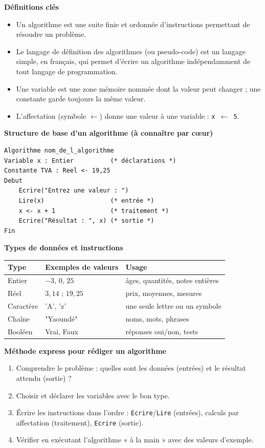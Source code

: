 \documentclass[11pt]{article}
\newcommand{\cle}[1]{{\popxbold\color{popdark}#1}}
\begin{document}
\begin{bilan}
\textbf{Définitions clés}
\begin{itemize}
  \item Un \cle{algorithme} est une suite finie et ordonnée d'instructions permettant de résoudre un problème.
  \item Le \cle{langage de définition des algorithmes} (ou pseudo-code) est un langage simple, en français, qui permet d'écrire un algorithme indépendamment de tout langage de programmation.
  \item Une \cle{variable} est une zone mémoire nommée dont la valeur peut changer ; une \cle{constante} garde toujours la même valeur.
  \item L'\cle{affectation} (symbole $\leftarrow$) donne une valeur à une variable : \texttt{x $\leftarrow$ 5}.
\end{itemize}

\textbf{Structure de base d'un algorithme (à connaître par cœur)}
\begin{lstlisting}
Algorithme nom_de_l_algorithme
Variable x : Entier          (* déclarations *)
Constante TVA : Reel <- 19,25
Debut
    Ecrire("Entrez une valeur : ")
    Lire(x)                  (* entrée *)
    x <- x + 1               (* traitement *)
    Ecrire("Résultat : ", x) (* sortie *)
Fin
\end{lstlisting}

\textbf{Types de données et instructions}
\begin{center}
\begin{tabularx}{\linewidth}{|l|X|X|}
\hline
\rowcolor{popblueL} \textbf{Type} & \textbf{Exemples de valeurs} & \textbf{Usage} \\
\hline
Entier & $-3$, $0$, $25$ & âges, quantités, notes entières \\
\hline
Réel & $3{,}14$ ; $19{,}25$ & prix, moyennes, mesures \\
\hline
Caractère & 'A', 'z' & une seule lettre ou un symbole \\
\hline
Chaîne & "Yaoundé" & noms, mots, phrases \\
\hline
Booléen & Vrai, Faux & réponses oui/non, tests \\
\hline
\end{tabularx}
\end{center}

\textbf{Méthode express pour rédiger un algorithme}
\begin{enumerate}
  \item Comprendre le problème : quelles sont les \cle{données} (entrées) et le \cle{résultat} attendu (sortie) ?
  \item Choisir et déclarer les variables avec le bon type.
  \item Écrire les instructions dans l'ordre : \texttt{Ecrire}/\texttt{Lire} (entrées), calculs par affectation (traitement), \texttt{Ecrire} (sortie).
  \item Vérifier en exécutant l'algorithme « à la main » avec des valeurs d'exemple.
\end{enumerate}
\end{bilan}
\end{document}
